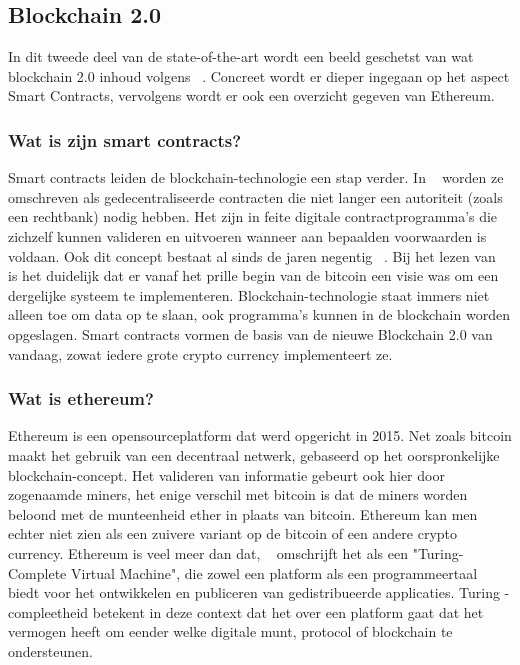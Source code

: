 \subsection*{Blockchain 2.0}
In dit tweede deel van de state-of-the-art wordt een beeld geschetst van wat blockchain 2.0 inhoud volgens ~\textcite{Swan2015}. Concreet wordt er dieper ingegaan op het aspect Smart Contracts, vervolgens wordt er ook een overzicht gegeven van Ethereum.

\subsubsection*{Wat is zijn smart contracts?}
Smart contracts leiden de blockchain-technologie een stap verder. In ~\textcite{Swan2015} worden ze omschreven als gedecentraliseerde contracten die niet langer een autoriteit (zoals een rechtbank) nodig hebben. Het zijn in feite digitale contractprogramma's die zichzelf kunnen valideren en uitvoeren wanneer aan bepaalden voorwaarden is voldaan. Ook dit concept bestaat al sinds de jaren negentig ~\autocite{Szabo1996}. Bij het lezen van ~\textcite{Nakamoto2008} is het duidelijk dat er vanaf het prille begin van de bitcoin een visie was om een dergelijke systeem te implementeren. Blockchain-technologie staat immers niet alleen toe om data op te slaan, ook programma's kunnen in de blockchain worden opgeslagen. Smart contracts vormen de basis van de nieuwe Blockchain 2.0 van vandaag, zowat iedere grote crypto currency implementeert ze.

\subsubsection*{Wat is ethereum?}
Ethereum is een opensourceplatform dat werd opgericht in 2015. Net zoals bitcoin maakt het gebruik van een decentraal netwerk, gebaseerd op het oorspronkelijke blockchain-concept. Het valideren van informatie gebeurt ook hier door zogenaamde miners, het enige verschil met bitcoin is dat de miners worden beloond met de munteenheid ether in plaats van bitcoin. Ethereum kan men echter niet zien als een zuivere variant op de bitcoin of een andere crypto currency. Ethereum is veel meer dan dat, ~\textcite{Swan2015} omschrijft het als een "Turing-Complete Virtual Machine", die zowel een platform als een programmeertaal biedt voor het ontwikkelen en publiceren van gedistribueerde applicaties. Turing -compleetheid betekent in deze context dat het over een platform gaat dat het vermogen heeft om eender welke digitale munt, protocol of blockchain te ondersteunen.

